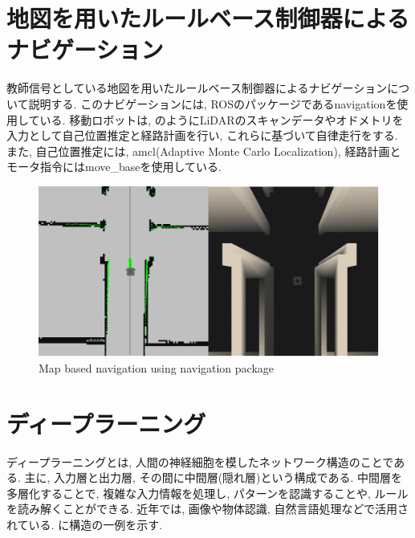 
\section{地図を用いたルールベース制御器によるナビゲーション}
教師信号としている地図を用いたルールベース制御器によるナビゲーションについて説明する. このナビゲーションには, ROSのパッケージであるnavigation\cite{navigation}を使用している. 移動ロボットは, のようにLiDARのスキャンデータやオドメトリを入力として自己位置推定と経路計画を行い, これらに基づいて自律走行をする. また, 自己位置推定には, amcl(Adaptive Monte Carlo Localization), 経路計画とモータ指令にはmove\_base\cite{navigation}を使用している. 

\begin{figure}[h]
     \centering
     \includegraphics[keepaspectratio, scale=0.3]
     {images/navigation.png}
     \caption{Map based navigation using navigation package}
     \label{Fig:navigation}
     \end{figure}

\section{ディープラーニング}
ディープラーニングとは, 人間の神経細胞を模したネットワーク構造のことである. 主に, 入力層と出力層, その間に中間層(隠れ層)という構成である. 中間層を多層化することで, 複雑な入力情報を処理し, パターンを認識することや, ルールを読み解くことができる. 近年では, 画像や物体認識, 自然言語処理などで活用されている. に構造の一例を示す. 

\vspace{30mm}

